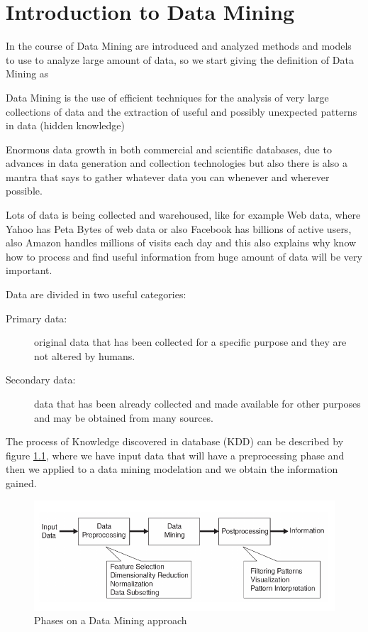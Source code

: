 \chapter{Introduction to Data Mining}
In the course of Data Mining are introduced and analyzed methods and models to use to analyze
large amount of data, so we start giving the definition of Data Mining as 
\begin{defi}
Data Mining is the use of efficient techniques for the analysis of very large collections of data and
the extraction of useful and possibly unexpected patterns in data (hidden knowledge)
\end{defi}
Enormous data growth in both commercial and scientific databases, due to advances in data generation and
collection technologies but also there is also a mantra that says to gather whatever data you can whenever and
wherever possible.

Lots of data is being collected and warehoused, like for example Web data, where Yahoo has Peta Bytes of web data
or also Facebook has billions of active users, also Amazon handles millions of visits each day and this also 
explains why know how to process and find useful information from huge amount of data will be very important.

Data are divided in two useful categories:
\begin{description}
    \item [Primary data: ] original data that has been collected for a specific purpose and they are 
                           not altered by humans.
    \item [Secondary data: ] data that has been already collected and made available for other purposes
                             and may be obtained from many sources.
\end{description}
The process of Knowledge discovered in database (KDD) can be described by figure \ref{img:phaseDataMining},
where we have input data that will have a preprocessing phase and then we applied to a data mining modelation
and we obtain the information gained.

\begin{figure}
    \caption{Phases on a Data Mining approach}
    \label{img:phaseDataMining}
    \includegraphics[width=\textwidth]{Images/dataMiningProcedure}
\end{figure}

